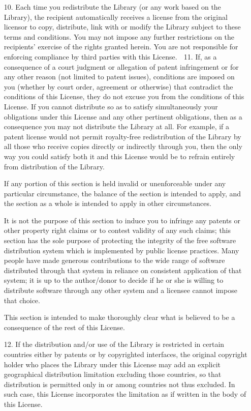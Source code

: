 {\begin{itemize}
\item [10.] Each time you redistribute the Library (or any work based
  on the Library), the recipient automatically receives a license from
  the original licensor to copy, distribute, link with or modify the
  Library subject to these terms and conditions.  You may not impose
  any further restrictions on the recipients' exercise of the rights
  granted herein.  You are not responsible for enforcing compliance by
  third parties with this License.   11. If, as a consequence of a
  court judgment or allegation of patent infringement or for any other
  reason (not limited to patent issues), conditions are imposed on you
  (whether by court order, agreement or otherwise) that contradict the
  conditions of this License, they do not excuse you from the
  conditions of this License.  If you cannot distribute so as to
  satisfy simultaneously your obligations under this License and any
  other pertinent obligations, then as a consequence you may not
  distribute the Library at all.  For example, if a patent license
  would not permit royalty-free redistribution of the Library by all
  those who receive copies directly or indirectly through you, then
  the only way you could satisfy both it and this License would be to
  refrain entirely from distribution of the Library.
    
  If any portion of this section is held invalid or unenforceable
  under any particular circumstance, the balance of the section is
  intended to apply, and the section as a whole is intended to apply
  in other circumstances.
    
  It is not the purpose of this section to induce you to infringe any
  patents or other property right claims or to contest validity of any
  such claims; this section has the sole purpose of protecting the
  integrity of the free software distribution system which is
  implemented by public license practices.  Many people have made
  generous contributions to the wide range of software distributed
  through that system in reliance on consistent application of that
  system; it is up to the author/donor to decide if he or she is
  willing to distribute software through any other system and a
  licensee cannot impose that choice.
    
  This section is intended to make thoroughly clear what is believed
  to be a consequence of the rest of this License.
  
\item [12.] If the distribution and/or use of the Library is
  restricted in certain countries either by patents or by copyrighted
  interfaces, the original copyright holder who places the Library
  under this License may add an explicit geographical distribution
  limitation excluding those countries, so that distribution is
  permitted only in or among countries not thus excluded.  In such
  case, this License incorporates the limitation as if written in the
  body of this License.
    

\end{itemize}}
